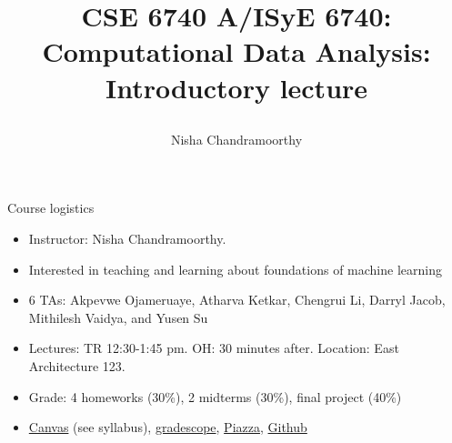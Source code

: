 \documentclass[final]{beamer}
\title{\begin{huge}{CSE 6740 A/ISyE 6740: Computational Data Analysis: Introductory lecture}\end{huge}} %
\author{Nisha Chandramoorthy} %
\begin{document}
\frame{\titlepage}

\begin{frame}{Course logistics}
\begin{itemize}
	\item Instructor: Nisha Chandramoorthy. 
	\pause
	\item Interested in teaching and learning about foundations of machine learning
	\pause
	\item 6 TAs: Akpevwe Ojameruaye, Atharva Ketkar, Chengrui Li, Darryl Jacob, Mithilesh Vaidya, and Yusen Su 
	\pause
	\item Lectures: TR 12:30-1:45 pm. OH: 30 minutes after. Location: East Architecture 123.
	\pause
	\item Grade: 4 homeworks (30\%), 2 midterms (30\%), final project (40\%)
	\pause
\item \href{https://canvas.gatech.edu}{Canvas} (see syllabus), \href{https://www.gradescope.com/courses/578036}{gradescope}, \href{https://piazza.com/gatech/fall2023/cse6740a/info}{Piazza}, \href{https://github.com/ni-sha-c/CSE-6740-Fall23}{Github}
\end{itemize}
\end{frame}
\end{document}
